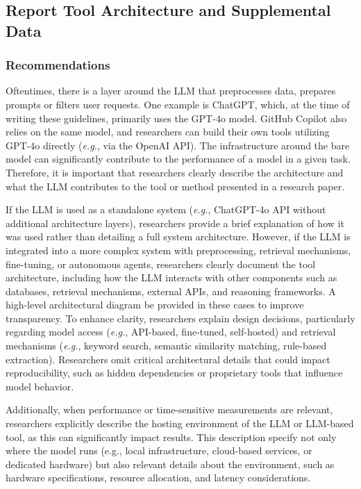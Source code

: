 



\subsection{Report Tool Architecture and Supplemental Data}

\subsubsection{Recommendations}

Oftentimes, there is a layer around the LLM that preprocesses data, prepares prompts or filters user requests. One example is ChatGPT, which, at the time of writing these guidelines, primarily uses the GPT-4o model. GitHub Copilot also relies on the same model, and researchers can build their own tools utilizing GPT-4o directly (\textit{e.g.}, via the OpenAI API). The infrastructure around the bare model can significantly contribute to the performance of a model in a given task.
Therefore, it is important that researchers clearly describe the architecture and what the LLM contributes to the tool or method presented in a research paper.


If the LLM is used as a standalone system (\textit{e.g.}, ChatGPT-4o API without additional architecture layers), researchers \should provide a brief explanation of how it was used rather than detailing a full system architecture. However, if the LLM is integrated into a more complex system with preprocessing, retrieval mechanisms, fine-tuning, or autonomous agents, researchers \must clearly document the tool architecture, including how the LLM interacts with other components such as databases, retrieval mechanisms, external APIs, and reasoning frameworks. A high-level architectural diagram \should be provided in these cases to improve transparency. To enhance clarity, researchers \should explain design decisions, particularly regarding model access (\textit{e.g.}, API-based, fine-tuned, self-hosted) and retrieval mechanisms (\textit{e.g.}, keyword search, semantic similarity matching, rule-based extraction). Researchers \mustnot omit critical architectural details that could impact reproducibility, such as hidden dependencies or proprietary tools that influence model behavior.

Additionally, when performance or time-sensitive measurements are relevant, researchers \should explicitly describe the hosting environment of the LLM or LLM-based tool, as this can significantly impact results. This description \should specify not only where the model runs (e.g., local infrastructure, cloud-based services, or dedicated hardware) but also relevant details about the environment, such as hardware specifications, resource allocation, and latency considerations.

